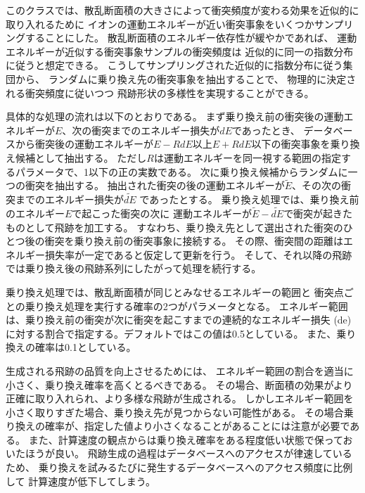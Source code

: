 \documentclass [11pt,a4paper,dvipdfmx] {jarticle}
\begin{document}
このクラスでは、散乱断面積の大きさによって衝突頻度が変わる効果を近似的に取り入れるために
イオンの運動エネルギーが近い衝突事象をいくつかサンプリングすることにした。
散乱断面積のエネルギー依存性が緩やかであれば、
運動エネルギーが近似する衝突事象サンプルの衝突頻度は
近似的に同一の指数分布に従うと想定できる。
こうしてサンプリングされた近似的に指数分布に従う集団から、
ランダムに乗り換え先の衝突事象を抽出することで、
物理的に決定される衝突頻度に従いつつ
飛跡形状の多様性を実現することができる。

具体的な処理の流れは以下のとおりである。
まず乗り換え前の衝突後の運動エネルギーが$E$、次の衝突までのエネルギー損失が$dE$であったとき、
データベースから衝突後の運動エネルギーが$E-RdE$以上$E+RdE$以下の衝突事象を乗り換え候補として抽出する。
ただし$R$は運動エネルギーを同一視する範囲の指定するパラメータで、1以下の正の実数である。
次に乗り換え候補からランダムに一つの衝突を抽出する。
抽出された衝突の後の運動エネルギーが$\tilde{E}$、その次の衝突までのエネルギー損失が$\tilde{dE}$
であったとする。
乗り換え処理では、乗り換え前のエネルギー$E$で起こった衝突の次に
運動エネルギーが$\tilde{E}-\tilde{dE}$で衝突が起きたものとして飛跡を加工する。
すなわち、乗り換え先として選出された衝突のひとつ後の衝突を乗り換え前の衝突事象に接続する。
その際、衝突間の距離はエネルギー損失率が一定であると仮定して更新を行う。
そして、それ以降の飛跡では乗り換え後の飛跡系列にしたがって処理を続行する。


乗り換え処理では、散乱断面積が同じとみなせるエネルギーの範囲と
衝突点ごとの乗り換え処理を実行する確率の2つがパラメータとなる。
エネルギー範囲は、乗り換え前の衝突が次に衝突を起こすまでの連続的なエネルギー損失 (de) 
に対する割合で指定する。デフォルトではこの値は0.5としている。
また、乗り換えの確率は0.1としている。

生成される飛跡の品質を向上させるためには、
エネルギー範囲の割合を適当に小さく、乗り換え確率を高くとるべきである。
その場合、断面積の効果がより正確に取り入れられ、より多様な飛跡が生成される。
しかしエネルギー範囲を小さく取りすぎた場合、乗り換え先が見つからない可能性がある。
その場合乗り換えの確率が、指定した値より小さくなることがあることには注意が必要である。
また、計算速度の観点からは乗り換え確率をある程度低い状態で保っておいたほうが良い。
飛跡生成の過程はデータベースへのアクセスが律速しているため、
乗り換えを試みるたびに発生するデータベースへのアクセス頻度に比例して
計算速度が低下してしまう。
\end{document}
